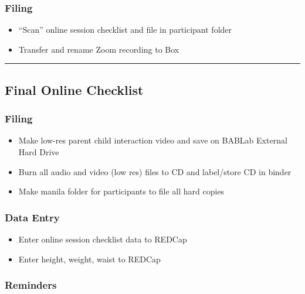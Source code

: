 \documentclass[]{book}
\providecommand{\tightlist}{%
  \setlength{\itemsep}{0pt}\setlength{\parskip}{0pt}}
\begin{document}
\hypertarget{filing}{%
\subsubsection{Filing}\label{filing}}

\begin{itemize}
\tightlist
\item
  ``Scan'' online session checklist and file in participant folder
\item
  Transfer and rename Zoom recording to Box
\end{itemize}

\begin{center}\rule{0.5\linewidth}{0.5pt}\end{center}

\hypertarget{final-online-checklist}{%
\subsection{Final Online Checklist}\label{final-online-checklist}}

\hypertarget{filing-1}{%
\subsubsection{Filing}\label{filing-1}}

\begin{itemize}
\tightlist
\item
  Make low-res parent child interaction video and save on BABLab External Hard Drive
\item
  Burn all audio and video (low res) files to CD and label/store CD in binder
\item
  Make manila folder for participants to file all hard copies
\end{itemize}

\hypertarget{data-entry}{%
\subsubsection{Data Entry}\label{data-entry}}

\begin{itemize}
\tightlist
\item
  Enter online session checklist data to REDCap
\item
  Enter height, weight, waist to REDCap
\end{itemize}

\hypertarget{reminders}{%
\subsubsection{Reminders}\label{reminders}}
\end{document}
